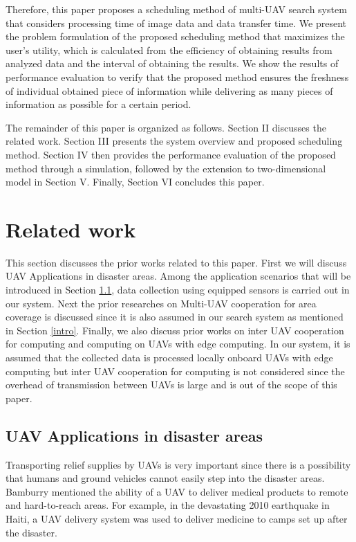 \documentclass{ieeeaccess}
\begin{document}
Therefore, this paper proposes a scheduling method of multi-UAV search system that considers processing time of image data and data transfer time.
We present the problem formulation of the proposed scheduling method that maximizes the user’s utility, which is calculated from the efficiency of obtaining results from analyzed data and the interval of obtaining the results.
We show the results of performance evaluation to verify that the proposed method ensures the freshness of individual obtained piece of information while delivering as many pieces of information as possible for a certain period.

The remainder of this paper is organized as follows. Section II discusses the related work. Section III presents the system overview and proposed scheduling method. Section IV then provides the performance evaluation of the proposed method through a simulation, followed by the extension to two-dimensional model in Section V. Finally, Section VI concludes this paper.
%
%
%
%
%
%
%
%
%
%
%
%
\section{Related work}
This section discusses the prior works related to this paper.
First we will discuss UAV Applications in disaster areas. 
Among the application scenarios that will be introduced in Section \ref{app}, data collection using equipped sensors is carried out in our system.
Next the prior researches on Multi-UAV cooperation for area coverage is discussed since it is also assumed in our search system as mentioned in Section \ref{intro}.
Finally, we also discuss prior works on inter UAV cooperation for computing and  computing on UAVs with edge computing.
In our system, it is assumed that the collected data is processed locally onboard UAVs with edge computing but inter UAV cooperation for computing is not considered since the overhead of transmission between UAVs is large and is out of the scope of this paper.

\subsection{UAV Applications in disaster areas}\label{app}
Transporting relief supplies by UAVs is very important since there is a possibility that humans and ground vehicles cannot easily step into the disaster areas.
Bamburry mentioned the ability of a UAV to deliver medical products to remote and hard-to-reach areas\cite{Bamburry2015}.
For example, in the devastating 2010 earthquake in Haiti, a UAV delivery system was used to deliver medicine to camps set up after the disaster\cite{May2015}.
\end{document}
